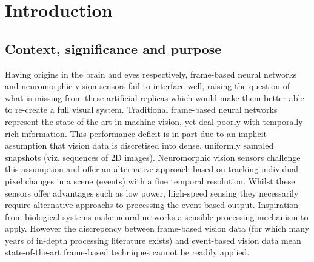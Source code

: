 \chapter{Introduction}
\section{Context, significance and purpose}


Having origins in the brain and eyes respectively, frame-based neural networks and neuromorphic vision sensors fail to interface well, raising the question of what is missing from these artificial replicas which would make them better able to re-create a full visual system. 
Traditional frame-based neural networks represent the state-of-the-art in machine vision, yet deal poorly with temporally rich information. 
This performance deficit is in part due to an implicit assumption that vision data is discretised into dense, uniformly sampled snapshots (viz. sequences of 2D images). 
Neuromorphic vision sensors challenge this assumption and offer an alternative approach based on tracking individual pixel changes in a scene (events) with a fine temporal resolution. 
Whilst these sensors offer advantages such as low power, high-speed sensing they necessarily require alternative approachs to processing the event-based output. 
Inspiration from biological systems make neural networks a sensible processing mechanism to apply. 
However the discrepency between frame-based vision data (for which many years of in-depth processing literature exists) and event-based vision data mean state-of-the-art frame-based techniques cannot be readily applied.

